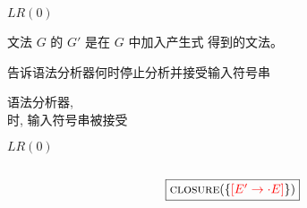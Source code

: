 \begin{frame}{}
  \begin{center}
    $LR(0)$ 

  \end{center}
\end{frame}

\begin{frame}{}
  \begin{center}
    \begin{definition}
      文法 $G$ 的 $G'$ 是在 $G$ 中加入产生式  得到的文法。
    \end{definition}

    \vspace{0.50cm}
     告诉语法分析器何时停止分析并接受输入符号串

    \vspace{0.80cm}
    语法分析器, \\[5pt]
    时, 输入符号串被接受
  \end{center}
\end{frame}

\begin{frame}{}
  \begin{center}
    $LR(0)$ 

    \vspace{0.30cm}

    \vspace{0.30cm}
  \end{center}
\end{frame}

\begin{frame}{}
  \begin{center}

    \begin{columns}
        
    \end{columns}

    \[
      \fbox{$\textsc{closure}(\{\textcolor{red}{[E' \to \cdot E]}\})$}
    \]
  \end{center}
\end{frame}

